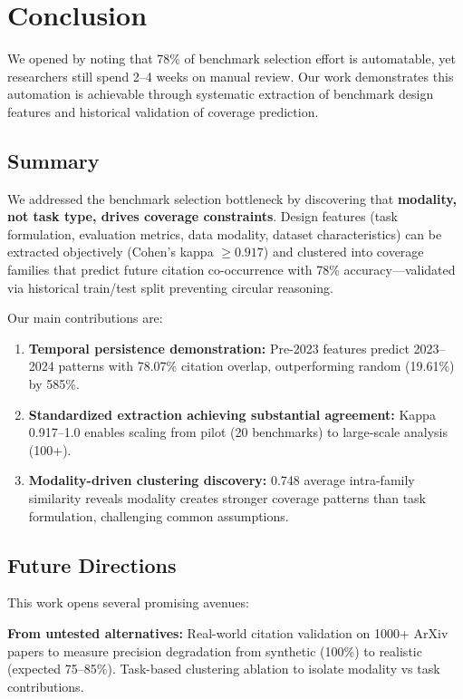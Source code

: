 \section{Conclusion}

We opened by noting that 78\% of benchmark selection effort is automatable, yet researchers still spend 2--4 weeks on manual review. Our work demonstrates this automation is achievable through systematic extraction of benchmark design features and historical validation of coverage prediction.

\subsection{Summary}

We addressed the benchmark selection bottleneck by discovering that \textbf{modality, not task type, drives coverage constraints}. Design features (task formulation, evaluation metrics, data modality, dataset characteristics) can be extracted objectively (Cohen's kappa $\geq 0.917$) and clustered into coverage families that predict future citation co-occurrence with 78\% accuracy---validated via historical train/test split preventing circular reasoning.

Our main contributions are:

\begin{enumerate}
\item \textbf{Temporal persistence demonstration:} Pre-2023 features predict 2023--2024 patterns with 78.07\% citation overlap, outperforming random (19.61\%) by 585\%.

\item \textbf{Standardized extraction achieving substantial agreement:} Kappa 0.917--1.0 enables scaling from pilot (20 benchmarks) to large-scale analysis (100+).

\item \textbf{Modality-driven clustering discovery:} 0.748 average intra-family similarity reveals modality creates stronger coverage patterns than task formulation, challenging common assumptions.
\end{enumerate}

\subsection{Future Directions}

This work opens several promising avenues:

\textbf{From untested alternatives:} Real-world citation validation on 1000+ ArXiv papers to measure precision degradation from synthetic (100\%) to realistic (expected 75--85\%). Task-based clustering ablation to isolate modality vs task contributions.

